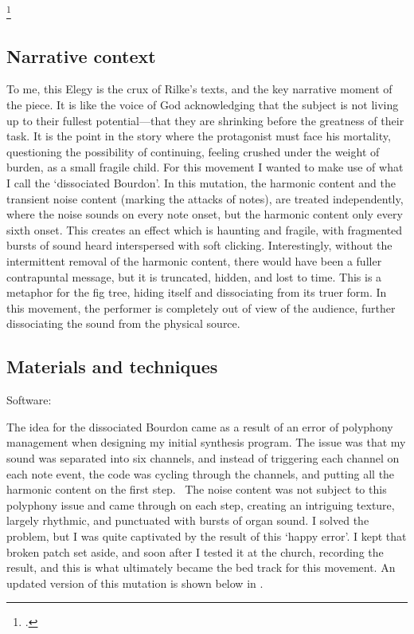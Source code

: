 \documentclass[12pt,twoside,maitrise]{dms_ks}
\theoremstyle{definition}
\begin{document}
{\footcitetext[57]{rilke_egies_1986}

\subsection{Narrative context}

To me, this Elegy is the crux of Rilke's texts, and the key narrative moment of the piece.
It is like the voice of God acknowledging that the subject is not living up to their fullest potential---that they are shrinking before the greatness of their task.
It is the point in the story where the protagonist must face his mortality, questioning the possibility of continuing, feeling crushed under the weight of burden, as a small fragile child.
For this movement I wanted to make use of what I call the `dissociated Bourdon'.
In this mutation, the harmonic content and the transient noise content (marking the attacks of notes), are treated independently, where the noise sounds on every note onset, but the harmonic content only every sixth onset.
This creates an effect which is haunting and fragile, with fragmented bursts of sound heard interspersed with soft clicking.
Interestingly, without the intermittent removal of the harmonic content, there would have been a fuller contrapuntal message, but it is truncated, hidden, and lost to time.
This is a metaphor for the fig tree, hiding itself and dissociating from its truer form.
In this movement, the performer is completely out of view of the audience, further dissociating the sound from the physical source.

\subsection{Materials and techniques}

Software:

The idea for the dissociated Bourdon came as a result of an error of polyphony management when designing my initial synthesis program.
The issue was that my sound was separated into six channels, and instead of triggering each channel on each note event, the code was cycling through the channels, and putting all the harmonic content on the first step.~
The noise content was not subject to this polyphony issue and came through on each step, creating an intriguing texture, largely rhythmic, and punctuated with bursts of organ sound.
I solved the problem, but I was quite captivated by the result of this `happy error'.
I kept that broken patch set aside, and soon after I tested it at the church, recording the result, and this is what ultimately became the bed track for this movement.
An updated version of this mutation is shown below in .

}
\end{document}
